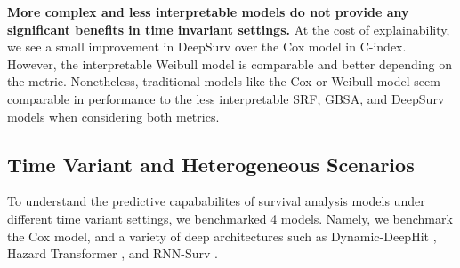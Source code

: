 \textbf{More complex and less interpretable models do not provide any significant benefits in time invariant settings.} At the cost of explainability, we see a small improvement in DeepSurv over the Cox model in C-index. However, the interpretable Weibull model is comparable and better depending on the metric. Nonetheless, traditional models like the Cox or Weibull model seem comparable in performance to the less interpretable SRF, GBSA, and DeepSurv models when considering both metrics.


\subsection{Time Variant and Heterogeneous Scenarios}
To understand the predictive capababilites of survival analysis models under different time variant settings, we benchmarked 4 models. Namely, we benchmark the Cox model, and a variety of deep architectures such as Dynamic-DeepHit \citep{lee2019dynamic_deephit}, Hazard Transformer \citep{hazard_transformer}, and RNN-Surv \citep{martinez2020rnnsurv}. 

